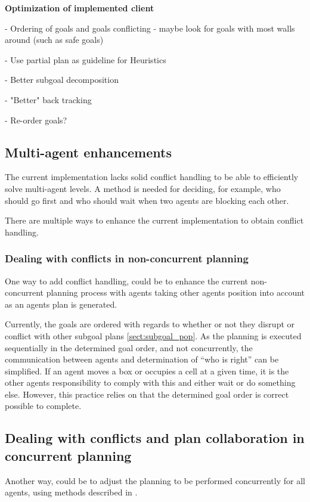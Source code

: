\documentclass[Main]{subfiles}
\begin{document}
\textbf{Optimization of implemented client}


- Ordering of goals and goals conflicting - maybe look for goals with most walls around (such as safe goals)

- Use partial plan as guideline for Heuristics

- Better subgoal decomposition

- "Better" back tracking

- Re-order goals?

\subsection{Multi-agent enhancements}

The current implementation lacks solid conflict handling to be able to efficiently solve multi-agent levels.
A method is needed for deciding, for example, who should go first and who should wait when two agents are blocking each other.

There are multiple ways to enhance the current implementation to obtain conflict handling.


\subsubsection{Dealing with conflicts in non-concurrent planning}

One way to add conflict handling, could be to enhance the current non-concurrent planning process with agents taking other agents position into account as an agents plan is generated.

Currently, the goals are ordered with regards to whether or not they disrupt or conflict with other subgoal plans \autoref{sect:subgoal_pop}.
As the planning is executed sequentially in the determined goal order, and not concurrently, the communication between agents and determination of ``who is right'' can be simplified.
If an agent moves a box or occupies a cell at a given time, it is the other agents responsibility to comply with this and either wait or do something else.
However, this practice relies on that the determined goal order is correct possible to complete.


\subsection{Dealing with conflicts and plan collaboration in concurrent planning}

Another way, could be to adjust the planning to be performed concurrently for all agents, using methods described in \cite{pellier2007unified}.
\end{document}
